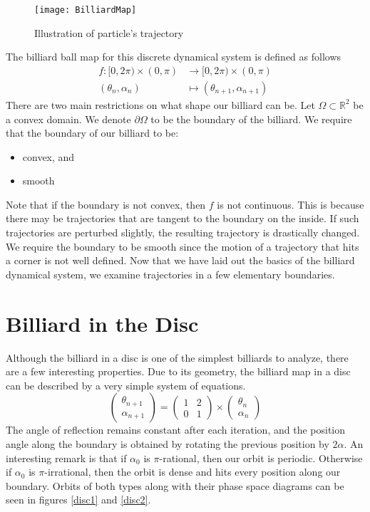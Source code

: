 \begin{figure}[h]
    \centering
    \texttt{[image: BilliardMap]}
    \caption{Illustration of particle's trajectory}
    \label{billiardmap}
\end{figure}
The billiard ball map for this discrete dynamical system is defined as follows
\begin{equation}
\begin{split}
    f: [0, 2\pi) \times (0,\pi) &\rightarrow [0, 2\pi) \times (0,\pi) \\
    (\theta_n,\alpha_n) &\mapsto (\theta_{n+1},\alpha_{n+1})
\end{split}
\end{equation}
There are two main restrictions on what shape our billiard can be. Let $\Omega \subset \mathbb{R}^2$ be a convex domain. We denote $\partial \Omega$ to be the boundary of the billiard. We require that the boundary of our billiard to be:
\begin{itemize}
    \item convex, and 
    \item smooth
\end{itemize}
Note that if the boundary is not convex, then $f$ is not continuous. This is because there may be trajectories that are tangent to the boundary on the inside. If such trajectories are perturbed slightly, the resulting trajectory is drastically changed. We require the boundary to be smooth since the motion of a trajectory that hits a corner is not well defined. Now that we have laid out the basics of the billiard dynamical system, we examine trajectories in a few elementary boundaries.

\section{Billiard in the Disc}
Although the billiard in a disc is one of the simplest billiards to analyze, there are a few interesting properties. Due to its geometry, the billiard map in a disc can be described by a very simple system of equations.
\begin{equation}
    \begin{pmatrix} \theta_{n+1} \\ \alpha_{n+1} \end{pmatrix} = \begin{pmatrix} 1 & 2 \\ 0 & 1 \end{pmatrix} \times \begin{pmatrix} \theta_n \\ \alpha_n \end{pmatrix}     
\end{equation}
The angle of reflection remains constant after each iteration, and the position angle along the boundary is obtained by rotating the previous position by $2\alpha$. 
An interesting remark is that if $\alpha_0$ is $\pi$-rational, then our orbit is periodic. Otherwise if $\alpha_0$ is $\pi$-irrational, then the orbit is dense and hits every position along our boundary. Orbits of both types along with their phase space diagrams can be seen in figures \ref{disc1} and \ref{disc2}.

